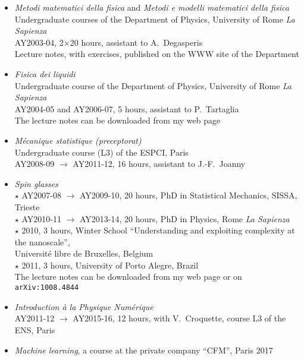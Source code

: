 \documentclass[a4paper,10pt]{article}
\begin{document}
\newpage


\vskip10pt
\begin{itemize}
\item {\it Metodi matematici della fisica} 
and {\it Metodi e modelli matematici della fisica} \\
Undergraduate courses of the
Department of Physics, 
University of Rome {\it La Sapienza} \\
AY2003-04, 2$\times$20 hours, assistant to A.~Degasperis \\
Lecture notes, with exercises, published on the WWW site of the Department
\item {\it Fisica dei liquidi} \\
Undergraduate course of the
Department of Physics, 
University of Rome {\it La Sapienza} \\
AY2004-05 and AY2006-07, 5 hours, assistant to P.~Tartaglia \\
The lecture notes can be downloaded from my web page
\item {\it M\'ecanique statistique (preceptorat)} \\
Undergraduate course (L3) of the ESPCI, Paris \\
AY2008-09 $\to$ AY2011-12, 16 hours, assistant to J.-F.~Joanny  
\item {\it Spin glasses} \\
$\star$ AY2007-08 $\to$ AY2009-10, 20 hours, PhD in Statistical Mechanics, SISSA, Trieste \\
$\star$ AY2010-11 $\to$ AY2013-14, 20 hours, PhD in Physics, Rome {\it La Sapienza} \\
$\star$ 2010, 3 hours, Winter School ``Understanding and exploiting complexity at the nanoscale'', \\
\phantom{$\star$ 2010,} Universit\'e libre de Bruxelles, Belgium \\
$\star$ 2011, 3 hours, University of Porto Alegre, Brazil \\
The lecture notes can be downloaded from my web page or on {\tt arXiv:1008.4844}
\item {\it Introduction \`a la Physique Num\'erique} \\
AY2011-12 $\to$ AY2015-16, 12 hours, with V.~Croquette,
course L3 of the ENS, Paris  
\item {\it Machine learning}, a course at the private company ``CFM'', Paris 2017 \\

\end{itemize}
\end{document}
